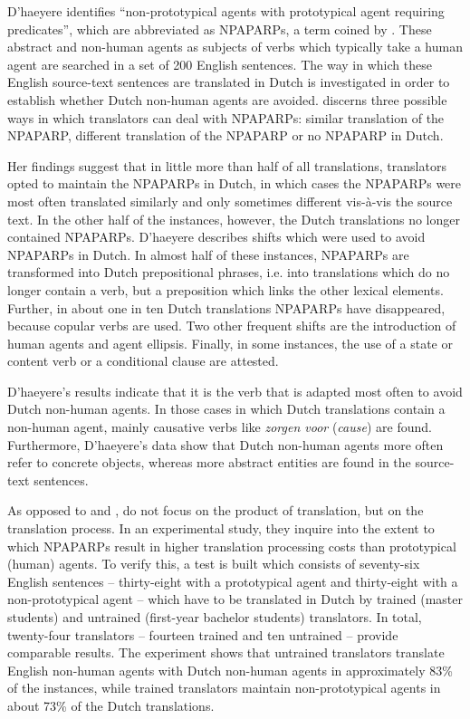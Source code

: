 \documentclass[output=paper]{LSP/langsci}
\begin{document}
D’haeyere identifies “non-prototypical agents with prototypical agent requiring predicates”, which are abbreviated as NPAPARPs, a term coined by \citet{Vandepitte2010}. These abstract and non-human agents as subjects of verbs which typically take a human agent are searched in a set of 200 English sentences. The way in which these English source-text sentences are translated in Dutch is investigated in order to establish whether Dutch non-human agents are avoided. \citet{Dhaeyere2010} discerns three possible ways in which translators can deal with NPAPARPs: similar translation of the NPAPARP, different translation of the NPAPARP or no NPAPARP in Dutch.  

Her findings suggest that in little more than half of all translations, translators opted to maintain the NPAPARPs in Dutch, in which cases the NPAPARPs were most often translated similarly and only sometimes different vis-à-vis the source text. In the other half of the instances, however, the Dutch translations no longer contained NPAPARPs. D’haeyere describes shifts which were used to avoid NPAPARPs in Dutch. In almost half of these instances, NPAPARPs are transformed into Dutch prepositional phrases, i.e. into translations which do no longer contain a verb, but a preposition which links the other lexical elements. Further, in about one in ten Dutch translations NPAPARPs have disappeared, because copular verbs are used. Two other frequent shifts are the introduction of human agents and agent ellipsis. Finally, in some instances, the use of a state or content verb or a conditional clause are attested. 

D’haeyere’s results indicate that it is the verb that is adapted most often to avoid Dutch non-human agents. In those cases in which Dutch translations contain a non-human agent, mainly causative verbs like \textit{zorgen voor} (\textit{cause}) are found. Furthermore, D’haeyere’s data show that Dutch non-human agents more often refer to concrete objects, whereas more abstract entities are found in the source-text sentences.       

As opposed to \citet{Vandepitte2007} and \citet{Dhaeyere2010}, \citet{Vandepitte2011} do not focus on the product of translation, but on the translation process. In an experimental study, they inquire into the extent to which NPAPARPs result in higher translation processing costs than prototypical (human) agents. To verify this, a test is built which consists of seventy-six English sentences – thirty-eight with a prototypical agent and thirty-eight with a non-prototypical agent – which have to be translated in Dutch by trained (master students) and untrained (first-year bachelor students) translators. In total, twenty-four translators – fourteen trained and ten untrained – provide comparable results. The experiment shows that untrained translators translate English non-human agents with Dutch non-human agents in approximately 83\% of the instances, while trained translators maintain non-prototypical agents in about 73\% of the Dutch translations. 
\end{document}
